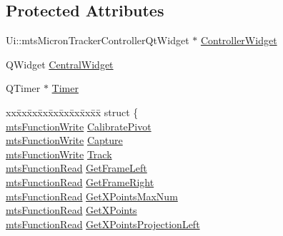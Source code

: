 \subsection*{Protected Attributes}
\begin{DoxyCompactItemize}
\item 
Ui\-::mts\-Micron\-Tracker\-Controller\-Qt\-Widget $\ast$ \hyperlink{classmts_micron_tracker_controller_qt_component_af0e9d2db7eabf1b7a405f93ce0ba48eb}{Controller\-Widget}
\item 
Q\-Widget \hyperlink{classmts_micron_tracker_controller_qt_component_a3dbbb592a657af89f0d956cfe3192a21}{Central\-Widget}
\item 
Q\-Timer $\ast$ \hyperlink{classmts_micron_tracker_controller_qt_component_a6f10236718137e39ed23b3d8b44450db}{Timer}
\item 
\begin{tabbing}
xx\=xx\=xx\=xx\=xx\=xx\=xx\=xx\=xx\=\kill
struct \{\\
\>\hyperlink{classmts_function_write}{mtsFunctionWrite} \hyperlink{classmts_micron_tracker_controller_qt_component_a9d2f06a80735cb7683087a3b6c182d0f}{CalibratePivot}\\
\>\hyperlink{classmts_function_write}{mtsFunctionWrite} \hyperlink{classmts_micron_tracker_controller_qt_component_a84845dc8f1102c8cad725dc4af8714f6}{Capture}\\
\>\hyperlink{classmts_function_write}{mtsFunctionWrite} \hyperlink{classmts_micron_tracker_controller_qt_component_a84667286a3af7870d553d47b1a012495}{Track}\\
\>\hyperlink{classmts_function_read}{mtsFunctionRead} \hyperlink{classmts_micron_tracker_controller_qt_component_a1ea05a723f36ecdbbf6d0a6b5d3a5da3}{GetFrameLeft}\\
\>\hyperlink{classmts_function_read}{mtsFunctionRead} \hyperlink{classmts_micron_tracker_controller_qt_component_a03286c9e24bcfb6b4f2844d32a810acc}{GetFrameRight}\\
\>\hyperlink{classmts_function_read}{mtsFunctionRead} \hyperlink{classmts_micron_tracker_controller_qt_component_a60560b239aeaa2195956432d427c1953}{GetXPointsMaxNum}\\
\>\hyperlink{classmts_function_read}{mtsFunctionRead} \hyperlink{classmts_micron_tracker_controller_qt_component_a13d765e020c059185fa31693a27c589f}{GetXPoints}\\
\>\hyperlink{classmts_function_read}{mtsFunctionRead} \hyperlink{classmts_micron_tracker_controller_qt_component_a87c6b979f25a860d9366410f629d174e}{GetXPointsProjectionLeft}\\

\end{tabbing}
\end{DoxyCompactItemize}
